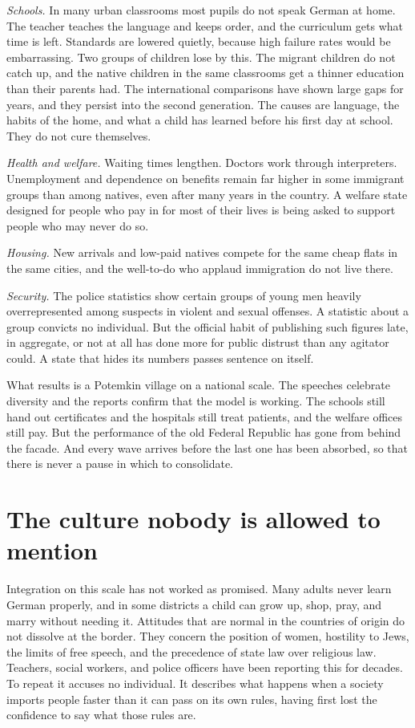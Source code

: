 \documentclass[12pt,a4paper]{book}
\begin{document}
\emph{Schools.} In many urban classrooms most pupils do not speak German at home. The teacher teaches the language and keeps order, and the curriculum gets what time is left. Standards are lowered quietly, because high failure rates would be embarrassing. Two groups of children lose by this. The migrant children do not catch up, and the native children in the same classrooms get a thinner education than their parents had. The international comparisons have shown large gaps for years, and they persist into the second generation. The causes are language, the habits of the home, and what a child has learned before his first day at school. They do not cure themselves.

\emph{Health and welfare.} Waiting times lengthen. Doctors work through interpreters. Unemployment and dependence on benefits remain far higher in some immigrant groups than among natives, even after many years in the country. A welfare state designed for people who pay in for most of their lives is being asked to support people who may never do so.

\emph{Housing.} New arrivals and low-paid natives compete for the same cheap flats in the same cities, and the well-to-do who applaud immigration do not live there.

\emph{Security.} The police statistics show certain groups of young men heavily overrepresented among suspects in violent and sexual offenses. A statistic about a group convicts no individual. But the official habit of publishing such figures late, in aggregate, or not at all has done more for public distrust than any agitator could. A state that hides its numbers passes sentence on itself.

What results is a Potemkin village on a national scale. The speeches celebrate diversity and the reports confirm that the model is working. The schools still hand out certificates and the hospitals still treat patients, and the welfare offices still pay. But the performance of the old Federal Republic has gone from behind the facade. And every wave arrives before the last one has been absorbed, so that there is never a pause in which to consolidate.

\section{The culture nobody is allowed to mention}

Integration on this scale has not worked as promised. Many adults never learn German properly, and in some districts a child can grow up, shop, pray, and marry without needing it. Attitudes that are normal in the countries of origin do not dissolve at the border. They concern the position of women, hostility to Jews, the limits of free speech, and the precedence of state law over religious law. Teachers, social workers, and police officers have been reporting this for decades. To repeat it accuses no individual. It describes what happens when a society imports people faster than it can pass on its own rules, having first lost the confidence to say what those rules are.
\end{document}
